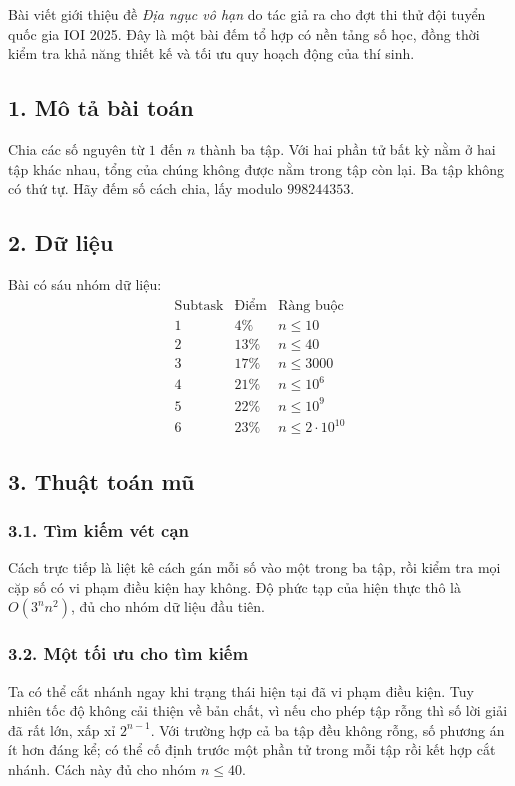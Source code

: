 \documentclass[11pt]{article}
\begin{document}
Bài viết giới thiệu đề \emph{Địa ngục vô hạn} do tác giả ra cho đợt thi thử
đội tuyển quốc gia IOI 2025. Đây là một bài đếm tổ hợp có nền tảng số học,
đồng thời kiểm tra khả năng thiết kế và tối ưu quy hoạch động của thí sinh.

\subsection*{1. Mô tả bài toán}

Chia các số nguyên từ \(1\) đến \(n\) thành ba tập. Với hai phần tử bất kỳ nằm
ở hai tập khác nhau, tổng của chúng không được nằm trong tập còn lại. Ba tập
không có thứ tự. Hãy đếm số cách chia, lấy modulo \(998244353\).

\subsection*{2. Dữ liệu}

Bài có sáu nhóm dữ liệu:
\[
\begin{array}{c|c|c}
\text{Subtask} & \text{Điểm} & \text{Ràng buộc}\\
\hline
1 & 4\% & n\le 10\\
2 & 13\% & n\le 40\\
3 & 17\% & n\le 3000\\
4 & 21\% & n\le 10^6\\
5 & 22\% & n\le 10^9\\
6 & 23\% & n\le 2\cdot 10^{10}
\end{array}
\]

\subsection*{3. Thuật toán mũ}

\subsubsection*{3.1. Tìm kiếm vét cạn}

Cách trực tiếp là liệt kê cách gán mỗi số vào một trong ba tập, rồi kiểm tra
mọi cặp số có vi phạm điều kiện hay không. Độ phức tạp của hiện thực thô là
\(O(3^n n^2)\), đủ cho nhóm dữ liệu đầu tiên.

\subsubsection*{3.2. Một tối ưu cho tìm kiếm}

Ta có thể cắt nhánh ngay khi trạng thái hiện tại đã vi phạm điều kiện. Tuy
nhiên tốc độ không cải thiện về bản chất, vì nếu cho phép tập rỗng thì số lời
giải đã rất lớn, xấp xỉ \(2^{n-1}\). Với trường hợp cả ba tập đều không rỗng,
số phương án ít hơn đáng kể; có thể cố định trước một phần tử trong mỗi tập rồi
kết hợp cắt nhánh. Cách này đủ cho nhóm \(n\le 40\).
\end{document}
